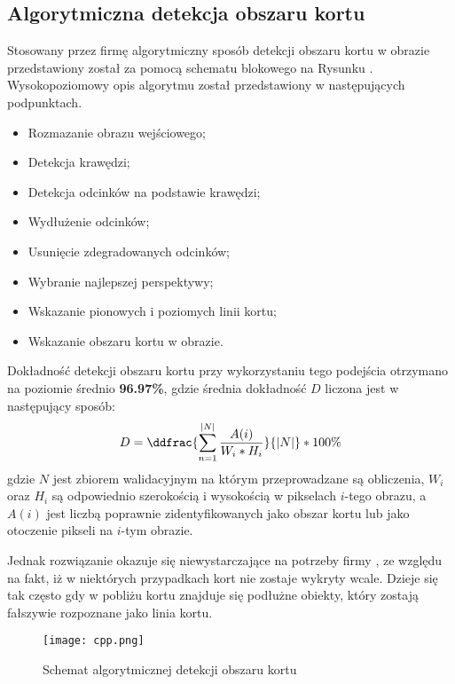 \subsection{Algorytmiczna detekcja obszaru kortu}
\label{sec:aglorytmiczna_detekcja}

Stosowany przez firmę \blue{} algorytmiczny sposób detekcji obszaru kortu w obrazie przedstawiony został za pomocą schematu blokowego na Rysunku . Wysokopoziomowy opis algorytmu został przedstawiony w następujących podpunktach.

\begin{itemize}
  \item Rozmazanie obrazu wejściowego; 
  \item Detekcja krawędzi;
  \item Detekcja odcinków na podstawie krawędzi;
  \item Wydłużenie odcinków;
  \item Usunięcie zdegradowanych odcinków;
  \item Wybranie najlepszej perspektywy;
  \item Wskazanie pionowych i poziomych linii kortu;
  \item Wskazanie obszaru kortu w obrazie.
\end{itemize}

Dokładność detekcji obszaru kortu przy wykorzystaniu tego podejścia otrzymano na poziomie średnio \textbf{96.97\%}, gdzie średnia dokładność $D$ liczona jest w następujący sposób:
\vspace{-3pt} 
\[
\vspace{-3pt}
D = \ddfrac{\sum_{n = 1}^{|N|} \frac{A(i)}{W_{i} * H_{i}}}{|N|} * 100\%
\vspace{-3pt}
\]
gdzie $N$ jest zbiorem walidacyjnym na którym przeprowadzane są obliczenia, $W_{i}$ oraz $H_{i}$ są odpowiednio szerokością i wysokością w pikselach $i$-tego obrazu, a $A(i)$ jest liczbą poprawnie zidentyfikowanych jako obszar kortu lub jako otoczenie pikseli na $i$-tym obrazie.

Jednak rozwiązanie okazuje się niewystarczające na potrzeby firmy \blue{}, ze względu na fakt, iż w niektórych przypadkach kort nie zostaje wykryty wcale. Dzieje się tak często gdy w pobliżu kortu znajduje się podłużne obiekty, który zostają fałszywie rozpoznane jako linia kortu.

\begin{figure}[h]
  \centering
  \caption{Schemat algorytmicznej detekcji obszaru kortu}
  \texttt{[image: cpp.png]}
  \label{fig:algcpp}
\end{figure}

